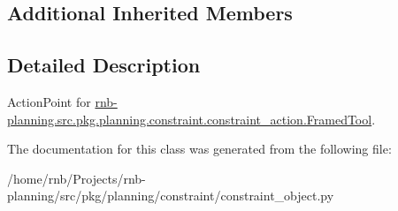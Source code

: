 \subsection*{Additional Inherited Members}


\subsection{Detailed Description}
Action\+Point for \hyperlink{classrnb-planning_1_1src_1_1pkg_1_1planning_1_1constraint_1_1constraint__action_1_1_framed_tool}{rnb-\/planning.\+src.\+pkg.\+planning.\+constraint.\+constraint\+\_\+action.\+Framed\+Tool}. 

The documentation for this class was generated from the following file\+:\begin{DoxyCompactItemize}
\item 
/home/rnb/\+Projects/rnb-\/planning/src/pkg/planning/constraint/constraint\+\_\+object.\+py\end{DoxyCompactItemize}
